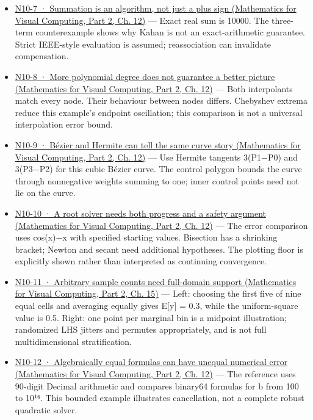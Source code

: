 \begin{itemize}
\item
  \href{../02-Mathematics-for-Visual-Computing-P02/main.pdf\#02-foundations-ii-ch028-figure-n10-7-summation-is-an-algorithm-not-just-a-plus-sign}{N10-7 · Summation is an algorithm, not just a plus sign (Mathematics for Visual Computing, Part 2, Ch. 12)} --- Exact real sum is 10000. The three-term counterexample shows why Kahan is not an exact-arithmetic guarantee. Strict IEEE-style evaluation is assumed; reassociation can invalidate compensation.
\item
  \href{../02-Mathematics-for-Visual-Computing-P02/main.pdf\#02-foundations-ii-ch028-figure-n10-8-more-polynomial-degree-does-not-guarantee-a-better-picture}{N10-8 · More polynomial degree does not guarantee a better picture (Mathematics for Visual Computing, Part 2, Ch. 12)} --- Both interpolants match every node. Their behaviour between nodes differs. Chebyshev extrema reduce this example's endpoint oscillation; this comparison is not a universal interpolation error bound.
\item
  \href{../02-Mathematics-for-Visual-Computing-P02/main.pdf\#02-foundations-ii-ch028-figure-n10-9-bézier-and-hermite-can-tell-the-same-curve-story}{N10-9 · Bézier and Hermite can tell the same curve story (Mathematics for Visual Computing, Part 2, Ch. 12)} --- Use Hermite tangents 3(P1−P0) and 3(P3−P2) for this cubic Bézier curve. The control polygon bounds the curve through nonnegative weights summing to one; inner control points need not lie on the curve.
\item
  \href{../02-Mathematics-for-Visual-Computing-P02/main.pdf\#02-foundations-ii-ch028-figure-n10-10-a-root-solver-needs-both-progress-and-a-safety-argument}{N10-10 · A root solver needs both progress and a safety argument (Mathematics for Visual Computing, Part 2, Ch. 12)} --- The error comparison uses cos(x)−x with specified starting values. Bisection has a shrinking bracket; Newton and secant need additional hypotheses. The plotting floor is explicitly shown rather than interpreted as continuing convergence.
\item
  \href{../02-Mathematics-for-Visual-Computing-P02/main.pdf\#02-foundations-ii-ch031-figure-n10-11-arbitrary-sample-counts-need-full-domain-support}{N10-11 · Arbitrary sample counts need full-domain support (Mathematics for Visual Computing, Part 2, Ch. 15)} --- Left: choosing the first five of nine equal cells and averaging equally gives E{[}y{]} = 0.3, while the uniform-square value is 0.5. Right: one point per marginal bin is a midpoint illustration; randomized LHS jitters and permutes appropriately, and is not full multidimensional stratification.
\item
  \href{../02-Mathematics-for-Visual-Computing-P02/main.pdf\#02-foundations-ii-ch028-figure-n10-12-algebraically-equal-formulas-can-have-unequal-numerical-error}{N10-12 · Algebraically equal formulas can have unequal numerical error (Mathematics for Visual Computing, Part 2, Ch. 12)} --- The reference uses 90-digit Decimal arithmetic and compares binary64 formulas for b from 100 to 10¹⁶. This bounded example illustrates cancellation, not a complete robust quadratic solver.
\end{itemize}

